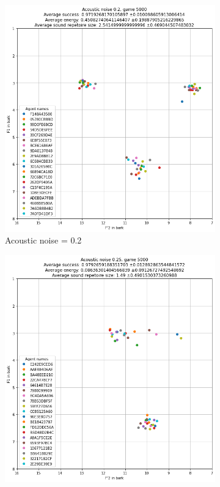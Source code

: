 \begin{figure}[ht]
\begin{subfigure}{.30\textwidth}
        \includegraphics[width=\textwidth]{images/extra/bark_noise_5.png}
        \captionsetup{width=0.9\linewidth}
        \captionsetup{justification=centering}
        \caption{Acoustic noise = 0.2}
    \end{subfigure}
    \hspace{0.5cm}
    \begin{subfigure}{.30\textwidth}
        \centering
        \includegraphics[width=\textwidth]{images/extra/bark_noise_6.png}

\end{subfigure}
\end{figure}
